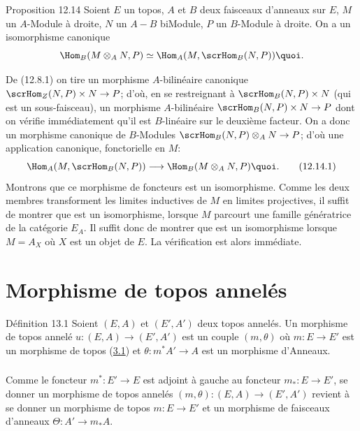 \documentclass[10pt]{../fichiers-configuration-latex/smfart}
\begin{document}
\begin{enonce*}{Proposition 12.14}
Soient $E$ un topos, $A$ et $B$ deux faisceaux d'anneaux sur $E$,
$M$ un $A$-Module à droite, $N$ un $A-B$ biModule, $P$ un $B$-Module
à droite. On a un isomorphisme canonique
$$
\Hom_B(M\otimes_A N,P)\simeq \Hom_A (M,\scrHom_B (N,P)){\quoi}.
$$
\end{enonce*}

\noindent De (12.8.1) on tire un morphisme $A$-bilinéaire
canonique $\scrHom_Z(N,P)\times N\rightarrow P$; d'où, en se
restreignant à $\scrHom_B(N,P)\times N$ (qui est un sous-faisceau),
un morphisme $A$-bilinéaire $\scrHom_B(N,P)\times N\rightarrow P$
dont on vérifie immédiatement qu'il est $B$-linéaire sur
le deuxième
facteur. On a donc un morphisme canonique de $B$-Modules
$\scrHom_B(N,P)\otimes_A N\rightarrow P$; d'où une application
canonique, fonctorielle en $M$:
\begin{equation*}
\Hom_A(M,\scrHom_B(N,P))\longrightarrow \Hom_B (M\otimes_A
N,P){\quoi}.\tag{12.14.1}
\end{equation*}
Montrons que ce morphisme de foncteurs est un isomorphisme. Comme
les deux membres transforment les limites inductives de $M$ en
limites projectives, il suffit de montrer que  est un
isomorphisme, lorsque $M$ parcourt une famille génératrice de la
catégorie $E_A$. Il suffit donc de montrer que  est
un isomorphisme lorsque $M=A_X$ où $X$ est un objet de $E$. La
vérification est alors immédiate.


\section{Morphisme de topos annelés}

\begin{enonce*}{Définition 13.1}
Soient $(E,A)$ et $(E',A')$ deux topos annelés. Un morphisme de
topos annelé $u:(E,A)\rightarrow (E',A')$ est un couple $(m,\theta)$
où $m:E\rightarrow E'$ est un morphisme de topos {\rm
(\hyperref[IV.def3.1]{3.1})} et $\theta:m^{\ast}A'\rightarrow A$ est un
morphisme d'Anneaux.
\end{enonce*}

\setcounter{subsection}{1}
\subsubsection{}
Comme le foncteur $m^{\ast}:E'\rightarrow E$ est adjoint à gauche au
foncteur $m_{\ast}:E\rightarrow E'$, se donner un morphisme de topos
annelés $(m,\theta):(E,A)\rightarrow (E',A')$ revient à se donner un
morphisme de topos $m:E\rightarrow E'$ et un morphisme de faisceaux
d'anneaux $\Theta:A'\rightarrow m_{\ast}A$.
\end{document}
